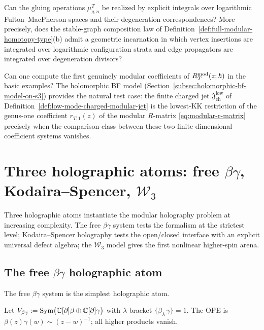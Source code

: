 \begin{problem}[Geometry]
\label{prob:modular-envelope-geometry}
Can the gluing operations $\mu_{g,n}^T$ be realized by explicit integrals over logarithmic
Fulton--MacPherson spaces \cite{Mok25} and their degeneration correspondences? More
precisely, does the stable-graph composition law of
Definition~\ref{def:full-modular-homotopy-type}\textup{(b)} admit a geometric incarnation in
which vertex insertions are integrated over logarithmic configuration strata and edge
propagators are integrated over degeneration divisors?
\end{problem}

\begin{problem}[Computation]
\label{prob:modular-envelope-computation}
Can one compute the first genuinely modular coefficients of
$R_T^{\mathrm{mod}}(z;\hbar)$ in the basic examples? The holomorphic BF model
(Section~\ref{subsec:holomorphic-bf-model-on-s3}) provides the natural test case: the finite
charged jet $\mathfrak J_{\mathrm{ch}}^{\mathrm{low}}$ of
Definition~\ref{def:low-mode-charged-modular-jet} is the lowest-KK restriction of the
genus-one coefficient $r_{T,1}(z)$ of the modular $R$-matrix
\eqref{eq:modular-r-matrix} precisely when the comparison class between these two
finite-dimensional coefficient systems vanishes.
\end{problem}

\section{Three holographic atoms: free $\beta\gamma$, Kodaira--Spencer, $\mathcal{W}_3$}
\label{sec:three-holographic-atoms}

Three holographic atoms instantiate the modular holography problem at
increasing complexity. The free $\beta\gamma$ system tests the
formalism at the strictest level; Kodaira--Spencer holography tests
the open/closed interface with an explicit universal defect algebra;
the $\mathcal{W}_3$ model gives the first nonlinear higher-spin arena.

\subsection{The free \texorpdfstring{$\beta\gamma$}{betagamma} holographic atom}
\label{subsec:betagamma-holographic-atom}

The free $\beta\gamma$ system is the simplest holographic atom.

\begin{definition}
\label{def:betagamma-chiral-algebra}
Let $V_{\beta\gamma} := \operatorname{Sym}\bigl(\mathbb C[\partial]\beta \oplus \mathbb C[\partial]\gamma\bigr)$
with $\lambda$-bracket $\{\beta_\lambda\,\gamma\} = 1$. The OPE is
$\beta(z)\gamma(w) \sim (z-w)^{-1}$; all higher products vanish.
\end{definition}

